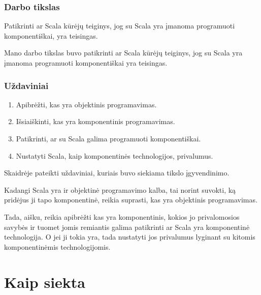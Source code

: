 \begin{frame}
  \frametitle{Darbo tikslas}
  Patikrinti ar Scala kūrėjų teiginys, jog su Scala yra įmanoma
  programuoti komponentiškai, yra teisingas.
  \begin{handout}
    Mano darbo tikslas buvo patikrinti ar Scala kūrėjų teiginys, jog
    su Scala yra įmanoma programuoti komponentiškai yra teisingas.
  \end{handout}
\end{frame}

\begin{frame}
  \frametitle{Uždaviniai}
  \begin{enumerate}
    \item Apibrėžti, kas yra objektinis programavimas.
    \item Išsiaiškinti, kas yra komponentinis programavimas.
    \item Patikrinti, ar su Scala galima programuoti komponentiškai.
    \item Nustatyti Scala, kaip komponentinės technologijos, privalumus.
  \end{enumerate}
  \begin{handout}
    Skaidrėje pateikti uždaviniai, kuriais buvo siekiama tikslo
    įgyvendinimo.

    Kadangi Scala yra ir objektinė programavimo kalba, tai
    norint suvokti, ką pridėjus ji tapo komponentinė, reikia
    suprasti, kas yra objektinis programavimas.

    Tada, aišku, reikia apibrėžti kas yra komponentinis, kokios jo
    privalomosios savybės ir tuomet jomis remiantis galima patikrinti
    ar Scala yra komponentinė technologija. O jei ji tokia yra,
    tada nustatyti jos privalumus lyginant su kitomis komponentinėmis
    technologijomis.
  \end{handout}
\end{frame}

\section{Kaip siekta}


